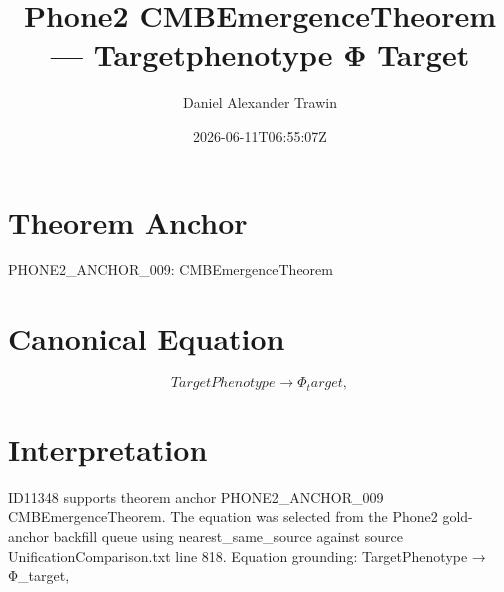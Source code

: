 \documentclass[11pt]{article}
\title{Phone2 CMBEmergenceTheorem — Targetphenotype Φ Target}
\author{Daniel Alexander Trawin}
\date{2026-06-11T06:55:07Z}
\begin{document}
\maketitle
\section*{Theorem Anchor}
PHONE2_ANCHOR_009: CMBEmergenceTheorem
\section*{Canonical Equation}
\[
TargetPhenotype → Φ_target,
\]
\section*{Interpretation}
ID11348 supports theorem anchor PHONE2_ANCHOR_009 CMBEmergenceTheorem. The equation was selected from the Phone2 gold-anchor backfill queue using nearest_same_source against source UnificationComparison.txt line 818. Equation grounding: TargetPhenotype → Φ_target,
\end{document}
